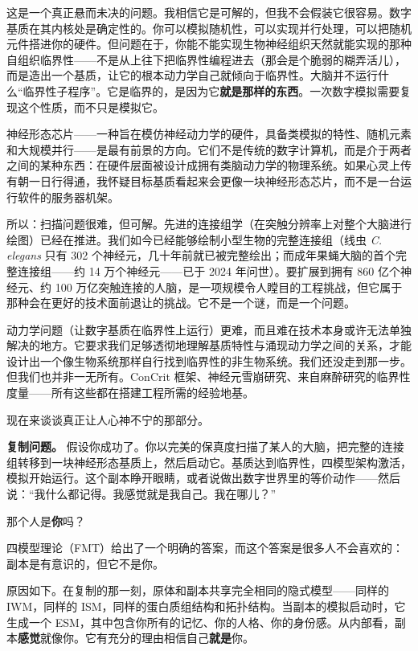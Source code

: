 \documentclass[11pt, twoside, openright]{book}
\begin{document}
这是一个真正悬而未决的问题。我相信它是可解的，但我不会假装它很容易。数字基质在其内核处是确定性的。你可以模拟随机性，可以实现并行处理，可以把随机元件搭进你的硬件。但问题在于，你能不能实现生物神经组织天然就能实现的那种自组织临界性------不是从上往下把临界性编程进去（那会是个脆弱的糊弄活儿），而是造出一个基质，让它的根本动力学自己就倾向于临界性。大脑并不运行什么“临界性子程序”。它是临界的，是因为它\textbf{就是那样的东西}。一次数字模拟需要复现这个性质，而不只是模拟它。

神经形态芯片------一种旨在模仿神经动力学的硬件，具备类模拟的特性、随机元素和大规模并行------是最有前景的方向。它们不是传统的数字计算机，而是介于两者之间的某种东西：在硬件层面被设计成拥有类脑动力学的物理系统。如果心灵上传有朝一日行得通，我怀疑目标基质看起来会更像一块神经形态芯片，而不是一台运行软件的服务器机架。

所以：扫描问题很难，但可解。先进的连接组学（在突触分辨率上对整个大脑进行绘图）已经在推进。我们如今已经能够绘制小型生物的完整连接组（线虫 \textit{C. elegans} 只有 302 个神经元，几十年前就已被完整绘出；而成年果蝇大脑的首个完整连接组------约 14 万个神经元------已于 2024 年问世）。要扩展到拥有 860 亿个神经元、约 100 万亿突触连接的人脑，是一项规模令人瞠目的工程挑战，但它属于那种会在更好的技术面前退让的挑战。它不是一个谜，而是一个问题。

动力学问题（让数字基质在临界性上运行）更难，而且难在技术本身或许无法单独解决的地方。它要求我们足够透彻地理解基质特性与涌现动力学之间的关系，才能设计出一个像生物系统那样自行找到临界性的非生物系统。我们还没走到那一步。但我们也并非一无所有。ConCrit 框架、神经元雪崩研究、来自麻醉研究的临界性度量------所有这些都在搭建工程所需的经验地基。

现在来谈谈真正让人心神不宁的那部分。

\textbf{复制问题。} 假设你成功了。你以完美的保真度扫描了某人的大脑，把完整的连接组转移到一块神经形态基质上，然后启动它。基质达到临界性，四模型架构激活，模拟开始运行。这个副本睁开眼睛，或者说做出数字世界里的等价动作------然后说：“我什么都记得。我感觉就是我自己。我在哪儿？”

那个人是\textbf{你}吗？

四模型理论（FMT）给出了一个明确的答案，而这个答案是很多人不会喜欢的：副本是有意识的，但它不是你。

原因如下。在复制的那一刻，原体和副本共享完全相同的隐式模型------同样的 IWM，同样的 ISM，同样的蛋白质组结构和拓扑结构。当副本的模拟启动时，它生成一个 ESM，其中包含你所有的记忆、你的人格、你的身份感。从内部看，副本\textbf{感觉}就像你。它有充分的理由相信自己\textbf{就是}你。
\end{document}
